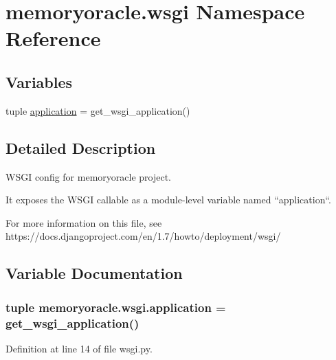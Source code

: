 \hypertarget{namespacememoryoracle_1_1wsgi}{}\section{memoryoracle.\+wsgi Namespace Reference}
\label{namespacememoryoracle_1_1wsgi}
\subsection*{Variables}
\begin{DoxyCompactItemize}
\item 
tuple \hyperlink{namespacememoryoracle_1_1wsgi_aa19120d9c42407746c9676a96206f976}{application} = get\+\_\+wsgi\+\_\+application()
\end{DoxyCompactItemize}


\subsection{Detailed Description}
\begin{DoxyVerb}WSGI config for memoryoracle project.

It exposes the WSGI callable as a module-level variable named ``application``.

For more information on this file, see
https://docs.djangoproject.com/en/1.7/howto/deployment/wsgi/
\end{DoxyVerb}
 

\subsection{Variable Documentation}
\hypertarget{namespacememoryoracle_1_1wsgi_aa19120d9c42407746c9676a96206f976}{}
\subsubsection[{application}]{\setlength{\rightskip}{0pt plus 5cm}tuple memoryoracle.\+wsgi.\+application = get\+\_\+wsgi\+\_\+application()}\label{namespacememoryoracle_1_1wsgi_aa19120d9c42407746c9676a96206f976}


Definition at line 14 of file wsgi.\+py.

